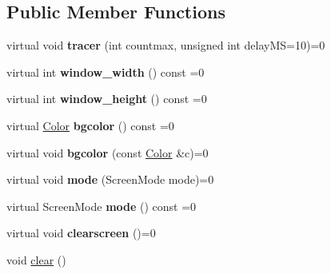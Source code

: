 \subsection*{Public Member Functions}
\begin{DoxyCompactItemize}
\item 
\mbox{\label{classcturtle_1_1AbstractTurtleScreen_ad8e8c7abcc876b2ddd7d19494bb71985}} 
virtual void {\bfseries tracer} (int countmax, unsigned int delay\+MS=10)=0
\item 
\mbox{\label{classcturtle_1_1AbstractTurtleScreen_a1ddb52212ec961b27c9c40c0786a2dee}} 
virtual int {\bfseries window\+\_\+width} () const =0
\item 
\mbox{\label{classcturtle_1_1AbstractTurtleScreen_a8a03d248a0a7b02e88d891f24a27fb8d}} 
virtual int {\bfseries window\+\_\+height} () const =0
\item 
\mbox{\label{classcturtle_1_1AbstractTurtleScreen_ac542d5c180390842d99a6078965aa077}} 
virtual \hyperlink{classcturtle_1_1Color}{Color} {\bfseries bgcolor} () const =0
\item 
\mbox{\label{classcturtle_1_1AbstractTurtleScreen_ac421f2018c0f88e3bc3b36f716c3fc04}} 
virtual void {\bfseries bgcolor} (const \hyperlink{classcturtle_1_1Color}{Color} \&c)=0
\item 
\mbox{\label{classcturtle_1_1AbstractTurtleScreen_a66a3002d3a6713e615a58b345ec21062}} 
virtual void {\bfseries mode} (Screen\+Mode mode)=0
\item 
\mbox{\label{classcturtle_1_1AbstractTurtleScreen_a6f4031d934f2785165b382384611b19d}} 
virtual Screen\+Mode {\bfseries mode} () const =0
\item 
\mbox{\label{classcturtle_1_1AbstractTurtleScreen_ad37d1976302819c74e766290a2128072}} 
virtual void {\bfseries clearscreen} ()=0
\item 
void \hyperlink{classcturtle_1_1AbstractTurtleScreen_abae240a2ba949c1628bb01ad850fb32b}{clear} ()

\end{DoxyCompactItemize}
